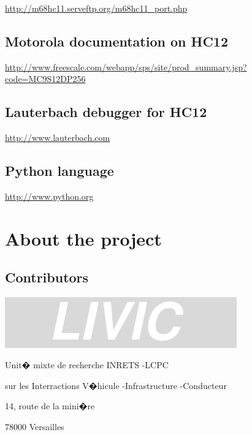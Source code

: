 \documentclass[12pt,english,a4paper]{book}
\begin{document}
\href{http://m68hc11.serveftp.org/m68hc11_port.php}{http://m68hc11.serveftp.org/m68hc11\_port.php}


\subsection{Motorola documentation on HC12 }

\href{http://www.freescale.com/webapp/sps/site/prod_summary.jsp?code=MC9S12DP256}{http://www.freescale.com/webapp/sps/site/prod\_summary.jsp?code=MC9S12DP256}


\subsection{Lauterbach debugger for HC12 }

\href{http://www.lauterbach.com/}{http://www.lauterbach.com}


\subsection{Python language }

\href{http://www.python.org/}{http://www.python.org}

\clearpage{}


\section{About the project}


\subsection{Contributors }

\begin{center}
\includegraphics[width=10cm]{Pictures/1000020100000258000000832C6FFAB4} 
\par\end{center}

Unit� mixte de recherche INRETS -LCPC

sur les Interractions V�hicule -Infrastructure -Conducteur

14, route de la mini�re

78000 Versailles
\end{document}
